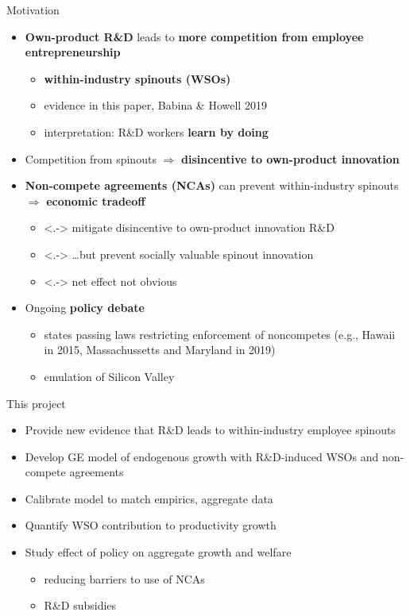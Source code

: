 \documentclass[english,usenames,dvipsnames]{beamer}
\begin{document}
\begin{frame}{Motivation}\label{motivation}
\begin{itemize}
	\item<+-> \alert{\textbf{Own-product R\&D}} leads to \alert{\textbf{more competition from employee entrepreneurship}}
	\begin{itemize}
		\item \alert{\textbf{within-industry spinouts (WSOs)}}
		\hyperlink{spinouts_examples}{} \hyperlink{spinouts_facts_from_literature}{} 
		\item evidence in this paper, Babina \& Howell 2019
		\item interpretation: R\&D workers \alert{\textbf{learn by doing}} 
	\end{itemize}
	\smallskip
	\item<+-> Competition from spinouts $\Rightarrow$ \alert{\textbf{disincentive to own-product innovation}}
	\smallskip
	\item<+-> \alert{\textbf{Non-compete agreements (NCAs)}} can prevent within-industry spinouts $\Rightarrow$ \alert{\textbf{economic tradeoff}}
	\begin{itemize}
		\item<.-> mitigate disincentive to own-product innovation R\&D
		\item<.-> \ldots but prevent socially valuable spinout innovation
		\item<.-> net effect not obvious
	\end{itemize}
	\smallskip
	\item<+-> Ongoing \alert{\textbf{policy debate}}
	\begin{itemize}
		\item states passing laws restricting enforcement of noncompetes (e.g., Hawaii in 2015, Massachussetts and Maryland in 2019) 
		\item emulation of Silicon Valley
	\end{itemize}
\end{itemize}
\end{frame}

\begin{frame}{This project}
\begin{itemize}
	\item Provide new evidence that R\&D leads to within-industry employee spinouts
	\smallskip
	\item Develop GE model of endogenous growth with R\&D-induced WSOs and non-compete agreements
	\smallskip
	\item Calibrate model to match empirics, aggregate data
	\smallskip
	\item Quantify WSO contribution to productivity growth
	\smallskip
	\item Study effect of policy on aggregate growth and welfare
	\begin{itemize}
		\item reducing barriers to use of NCAs
		\item R\&D subsidies
	\end{itemize}
\end{itemize}
\end{frame}
\end{document}
